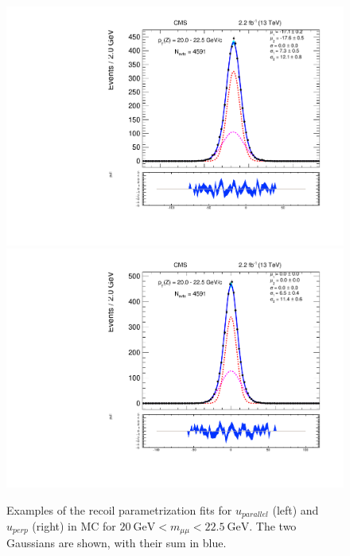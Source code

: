 \begin{figure}
\centering
\includegraphics[width=0.49\linewidth]{plots/Recoil/example-mc-pfu1fit_12.pdf}
\includegraphics[width=0.49\linewidth]{plots/Recoil/example-mc-pfu2fit_12.pdf}
\caption{Examples of the recoil parametrization fits for $u_{parallel}$ (left) and $u_{perp}$ (right) in MC for $20~\mathrm{GeV} < m_{\mu\mu}  < 22.5~\mathrm{GeV}$. The two Gaussians are shown, with their sum in blue.}
\label{fig:recoil:mc_fit_example}
\end{figure}